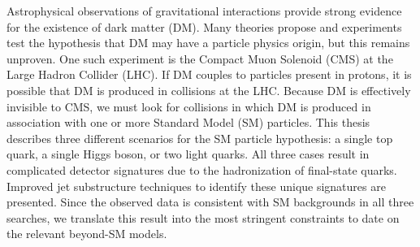 % 
% 
%

Astrophysical observations of gravitational interactions provide strong evidence for the existence of dark matter (DM). 
Many theories propose and experiments test the hypothesis that DM may have a particle physics origin, but this remains unproven. 
One such experiment is the Compact Muon Solenoid (CMS) at the Large Hadron Collider (LHC). 
If DM couples to particles present in protons, it is possible that DM is produced in collisions at the LHC. 
Because DM is effectively invisible to CMS, we must look for collisions in which DM is produced in association with one or more Standard Model (SM) particles. 
This thesis describes three different scenarios for the SM particle hypothesis: a single top quark, a single Higgs boson, or two light quarks. 
All three cases result in complicated detector signatures due to the hadronization of final-state quarks. 
Improved jet substructure techniques to identify these unique signatures are presented. 
Since the observed data is consistent with SM backgrounds in all three searches, we translate this result into the most stringent constraints to date on the relevant beyond-SM models.

